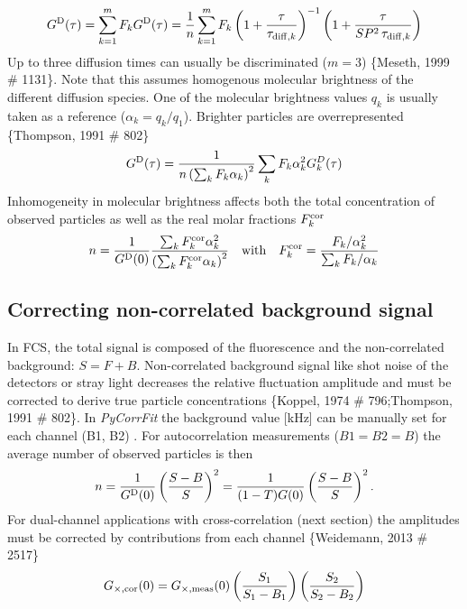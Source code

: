 	\begin{equation}
	\label{eq14}
	G^{\rm D}(\tau) = \sum_{k=1}^m F_k G^{\rm D}(\tau) = \frac{1}{n} \sum_{k=1}^m F_k \left(1+\frac{\tau}{\tau_{{\rm diff},k}} \right) ^{-1} \left(1+\frac{\tau}{SP^2 \, \tau_{{\rm diff},k}} \right)
	\end{equation}
Up to three diffusion times can usually be discriminated ($m = 3$) \{Meseth, 1999 \# 1131\}. Note that this assumes homogenous molecular brightness of the different diffusion species. One of the molecular brightness values $q_k$ is usually taken as a reference ($\alpha_k = q_k/q_1$). Brighter particles are overrepresented \{Thompson, 1991 \# 802\}
	\begin{equation}
	\label{eq15}
	G^{\rm D}(\tau) = \frac{1}{n \left( \sum_k F_k \alpha_k \right)^2} \sum_k F_k \alpha_k^2 G_k^D(\tau)
	\end{equation}
Inhomogeneity in molecular brightness affects both the total concentration of observed particles as well as the real molar fractions $F_k^{\rm cor}$
	\begin{equation}
	\label{eq16}
	n = \frac{1}{G^{\rm D}(0)} \frac{\sum_k F_k^{\rm {cor}} \alpha_k^2}{\left( \sum_k F_k^{\rm {cor}} \alpha_k \right)^2} \quad\mbox {with} \quad F_k^{\rm {cor}} = \frac{F_k/\alpha_k^2}{\sum_k F_k/\alpha_k}
	\end{equation}

\subsection{Correcting non-correlated background signal}
\label{sec:theor.correc}
In FCS, the total signal is composed of the fluorescence and the non-correlated background: $S = F + B$. Non-correlated background signal like shot noise of the detectors or stray light decreases the relative fluctuation amplitude and must be corrected to derive true particle concentrations \{Koppel, 1974 \# 796;Thompson, 1991 \# 802\}. In \textit{PyCorrFit} the background value [kHz] can be manually set for each channel (B1, B2) . For autocorrelation measurements ($B1 = B2 = B$) the average number of observed particles is then
	\begin{equation}
	\label{eq17}
	n = \frac{1}{G^{\rm D}(0)} \left( \frac{S-B}{S} \right)^2 = \frac{1}{(1-T)G(0)} \left( \frac{S-B}{S} \right)^2.
	\end{equation}
For dual-channel applications with cross-correlation (next section) the amplitudes must be corrected by contributions from each channel \{Weidemann, 2013 \# 2517\}
	\begin{equation}
	\label{eq18}
	G_{\times,\rm {cor}}(0) = G_{\times, \rm meas}(0) \left( \frac{S_1}{S_1-B_1} \right) \left( \frac{S_2}{S_2-B_2} \right) 
	\end{equation}

